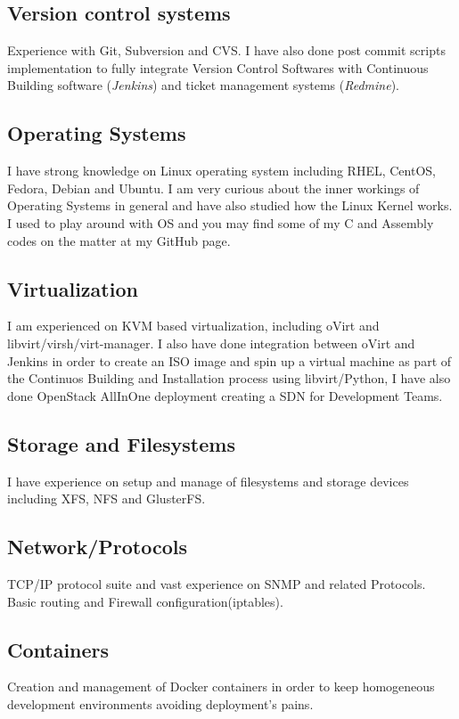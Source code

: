 \documentclass{article}
\begin{document}
\begin{multicols}{2}
\subsection{Version control systems}
Experience with Git, Subversion and CVS. I have also done post commit scripts
implementation to fully integrate Version Control Softwares with Continuous
Building software (\textit{Jenkins}) and ticket management systems 
(\textit{Redmine}). 

\subsection{Operating Systems}
I have strong knowledge on Linux operating system including RHEL, CentOS,
Fedora, Debian and Ubuntu. I am very curious about the inner workings of 
Operating Systems in general and have also studied how the Linux Kernel
works. I used to play around with OS and you may find some of my C and
Assembly codes on the matter at my GitHub page.

\subsection{Virtualization}
I am experienced on KVM based virtualization, including oVirt
and libvirt/virsh/virt-manager. I also have done integration between oVirt
and Jenkins in order to create an ISO image and spin up a virtual machine as part of 
the Continuos Building and Installation process using libvirt/Python, I have also 
done OpenStack AllInOne deployment creating a SDN for Development Teams.

\subsection{Storage and Filesystems}
I have experience on setup and manage of filesystems and storage devices
including XFS, NFS and GlusterFS.

\subsection{Network/Protocols}
TCP/IP protocol suite and vast experience on SNMP and related Protocols. Basic 
routing and Firewall configuration(iptables).

\subsection{Containers}
Creation and management of Docker containers in order to keep
homogeneous development environments avoiding deployment's pains.


\end{multicols}
\end{document}
